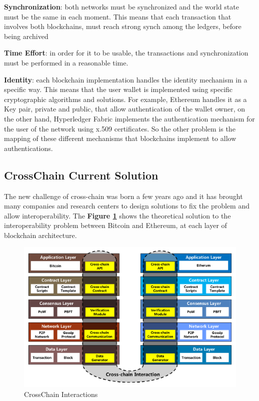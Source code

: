 \begin{outline}
    \1 \textbf{Synchronization}: both networks must be synchronized and the world state must be the same in 
    each moment. This means that each transaction that involves both blockchains, must reach strong synch among 
    the ledgers, before being archived

    \1 \textbf{Time Effort}: in order for it to be usable, the transactions and synchronization
    must be performed in a reasonable time.
    
    \1 \textbf{Identity}: each blockchain implementation handles the identity mechanism in a specific way. 
    This means that the user wallet is implemented using specific cryptographic algorithms and solutions. For 
    example, Ethereum handles it as a Key pair, private and public, that allow authentication of the wallet 
    owner, on the other hand, Hyperledger Fabric implements the authentication mechanism for the user of the 
    network using x.509 certificates. So the other problem is the mapping of these different mechanisms that 
    blockchains implement to allow authentications. 
\end{outline}


\subsection{CrossChain Current Solution}

The new challenge of cross-chain was born a few years ago and it has brought many companies and research centers 
to design solutions to fix the problem and allow interoperability. The \textbf{Figure \ref{fig:crosschain-interaction}} 
shows the theoretical solution to the interoperability problem between Bitcoin and Ethereum, at each layer of 
blockchain architecture\cite{crosschain-level}.

\begin{figure}[h!]
	\centering
	\includegraphics[totalheight=6cm]{img/crosschain.PNG}
	\caption{CrossChain Interactions}
	\label{fig:crosschain-interaction}
\end{figure}

